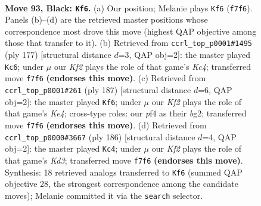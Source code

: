 \documentclass[11pt]{article}
\begin{document}
\clearpage

\begin{figure}[p]\centering
\begin{subfigure}{0.46\textwidth}\centering
\resizebox{\linewidth}{!}{%
\newchessgame
\chessboard[
  setfen={8/5k2/8/5p2/5P2/3b3K/8/8 b - - 1 93},
  showmover=false,
  pgfstyle=straightmove, color=movearrow, markmove={f7-f6}
]}
\caption{}
\end{subfigure}\hfill
\begin{subfigure}{0.46\textwidth}\centering
\resizebox{\linewidth}{!}{%
\newchessgame
\chessboard[
  setfen={1b6/8/8/2k1pB2/8/5P2/8/5K2 b - - 0 89},
  showmover=false,
  pgfstyle=straightmove, color=movearrow, markmove={c5-c6}
]}
\caption{}
\end{subfigure}
\\[4pt]
\begin{subfigure}{0.46\textwidth}\centering
\resizebox{\linewidth}{!}{%
\newchessgame
\chessboard[
  setfen={8/4b3/8/2p1k3/8/3K2p1/6B1/8 b - - 59 94},
  showmover=false,
  pgfstyle=straightmove, color=movearrow, markmove={e5-f6}
]}
\caption{}
\end{subfigure}\hfill
\begin{subfigure}{0.46\textwidth}\centering
\resizebox{\linewidth}{!}{%
\newchessgame
\chessboard[
  setfen={1k6/8/8/1n6/8/3K3p/7P/6B1 w - - 18 94},
  showmover=false,
  pgfstyle=straightmove, color=movearrow, markmove={d3-c4}
]}
\caption{}
\end{subfigure}
\caption{\textbf{Move 93, Black: \texttt{Kf6}.} (a) Our position; Melanie plays \texttt{Kf6} (\texttt{f7f6}). Panels (b)--(d) are the retrieved master positions whose correspondence most drove this move (highest QAP objective among those that transfer to it). (b) Retrieved from \texttt{ccrl\_top\_p0001\#1495} (ply 177) [structural distance $d$=3, QAP obj=2]: the master played \texttt{Kc6}; under $\mu$ our \emph{Kf2} plays the role of that game's \emph{Kc4}; transferred move \texttt{f7f6} \textbf{(endorses this move)}. (c) Retrieved from \texttt{ccrl\_top\_p0001\#261} (ply 187) [structural distance $d$=6, QAP obj=2]: the master played \texttt{Kf6}; under $\mu$ our \emph{Kf2} plays the role of that game's \emph{Ke4}; cross-type roles: our \emph{p}f4 as their \emph{b}g2; transferred move \texttt{f7f6} \textbf{(endorses this move)}. (d) Retrieved from \texttt{ccrl\_top\_p0000\#3667} (ply 186) [structural distance $d$=4, QAP obj=2]: the master played \texttt{Kc4}; under $\mu$ our \emph{Kf2} plays the role of that game's \emph{Kd3}; transferred move \texttt{f7f6} \textbf{(endorses this move)}. Synthesis: 18 retrieved analogs transferred to \texttt{Kf6} (summed QAP objective 28, the strongest correspondence among the candidate moves); Melanie committed it via the \texttt{search} selector.}
\label{fig:thought-m185}
\end{figure}
\end{document}
